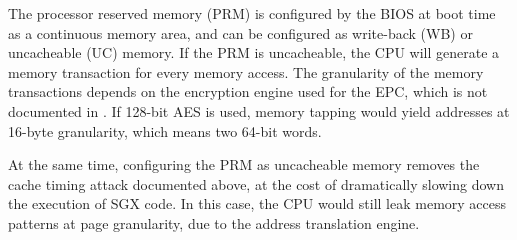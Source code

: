 The processor reserved memory (PRM) is configured by the BIOS at boot time as
a continuous memory area, and can be configured as write-back (WB) or
uncacheable (UC) memory. If the PRM is uncacheable, the CPU will generate a
memory transaction for every memory access. The granularity of the memory
transactions depends on the encryption engine used for the EPC, which is not
documented in \cite{intel2015sdm}. If 128-bit AES is used, memory tapping
would yield addresses at 16-byte granularity, which means two 64-bit words.

At the same time, configuring the PRM as uncacheable memory removes the cache
timing attack documented above, at the cost of dramatically slowing down the
execution of SGX code. In this case, the CPU would still leak memory access
patterns at page granularity, due to the address translation engine.
